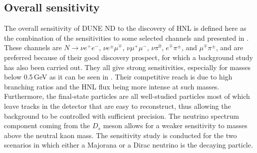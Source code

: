 \subsection{Overall sensitivity}

The overall sensitivity of DUNE ND to the discovery of HNL is defined here as the combination of the sensitivities %
to some selected channels and presented in .
These channels are $N \to \nu e^+ e^-$, $\nu e^\pm \mu^\mp$, $\nu \mu^+\mu^-$, $\nu\pi^0$, $e^\mp\pi^\pm$, and $\mu^\mp\pi^\pm$, %
and are preferred because of their good discovery prospect, for which a background study has also been carried out.
They all give strong sensitivities, especially for masses below 0.5\,GeV as it can be seen in .
Their competitive reach is due to high branching ratios and the HNL flux being more intense at such masses.
Furthermore, the final-state particles are all well-studied particles most of which leave tracks in the detector %
that are easy to reconstruct, thus allowing the background to be controlled with sufficient precision.
The neutrino spectrum component coming from the $D_s$ meson allows for a weaker sensitivity %
to masses above the neutral kaon mass.
The sensitivity study is conducted for the two scenarios in which either a Majorana or a Dirac neutrino is the decaying particle.


